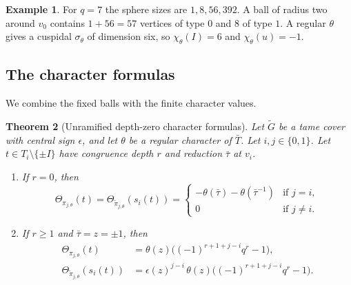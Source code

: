 \documentclass[12pt,letterpaper]{article}
\numberwithin{equation}{section}
\newtheorem{theorem}{Theorem}[section]
\theoremstyle{definition}
\newtheorem{example}[theorem]{Example}
\theoremstyle{remark}
\newcommand{\Gt}{\widetilde G}
\newcommand{\sgn}{\epsilon}
\begin{document}
\begin{example}
For $q=7$ the sphere sizes are $1,8,56,392$. A ball of radius two around $v_0$ contains $1+56=57$ vertices of type $0$ and $8$ of type $1$. A regular $\theta$ gives a cuspidal $\sigma_\theta$ of dimension six, so $\chi_\theta(I)=6$ and $\chi_\theta(u)=-1$.
\end{example}

\subsection*{The character formulas}
We combine the fixed balls with the finite character values.

\begin{theorem}[Unramified depth-zero character formulas]\label{thm:depthzero}
Let $\Gt$ be a tame cover with central sign $\sgn$, and let $\theta$ be a regular character of $\bar T$. Let $i,j\in\{0,1\}$. Let $t\in T_i\setminus\{\pm I\}$ have congruence depth $r$ and reduction $\bar\tau$ at $v_i$.
\begin{enumerate}[label=(\alph*),leftmargin=2.2em]
\item If $r=0$, then
\[
 \Theta_{\pi_{j,\theta}}(t)=\Theta_{\widetilde\pi_{j,\theta}}(s_i(t))=
 \begin{cases}
 -\theta(\bar\tau)-\theta(\bar\tau^{-1})&\text{if } j=i,\\
 0&\text{if } j\ne i.
 \end{cases}
\]
\item If $r\ge1$ and $\bar\tau=z=\pm1$, then
\begin{align}
 \Theta_{\pi_{j,\theta}}(t)&=\theta(z)
 \bigl((-1)^{r+1+j-i}q^r-1\bigr),\label{eq:closed}\\
 \Theta_{\widetilde\pi_{j,\theta}}(s_i(t))
 &=\sgn(z)^{j-i}\,\theta(z)
 \bigl((-1)^{r+1+j-i}q^r-1\bigr).\label{eq:closedgen}
\end{align}
\end{enumerate}
\end{theorem}
\end{document}
